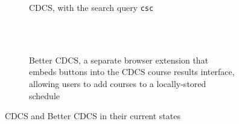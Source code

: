 \begin{figure}[ht]
    \centering
        \begin{subfigure}[h]{14cm}
            \centering
            \caption{CDCS, with the search query {\tt csc}}
            \label{fig:cdcs-index}
        \end{subfigure}\\
        \vspace{10pt}\\
        \begin{subfigure}[h]{14cm}
            \centering
            \caption{Better CDCS, a separate browser extension that embeds buttons into the CDCS course results interface, allowing users to add courses to a locally-stored schedule}
            \label{fig:cdcs-better}
        \end{subfigure}
    \caption{CDCS and Better CDCS in their current states}
\end{figure}


